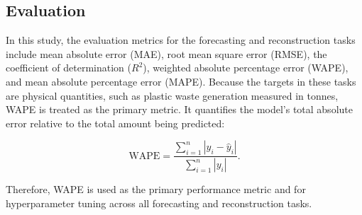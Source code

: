 \subsection{Evaluation}

In this study, the evaluation metrics for the forecasting and reconstruction tasks include mean absolute error (MAE), root mean square error (RMSE), the coefficient of determination (\(R^2\)), weighted absolute percentage error (WAPE), and mean absolute percentage error (MAPE). Because the targets in these tasks are physical quantities, such as plastic waste generation measured in tonnes, WAPE is treated as the primary metric. It quantifies the model's total absolute error relative to the total amount being predicted:

\begin{equation}
	\text{WAPE} = \frac{\sum_{i=1}^{n} |y_i - \hat{y}_i|}{\sum_{i=1}^{n} |y_i|}.
\end{equation}

Therefore, WAPE is used as the primary performance metric and for hyperparameter tuning across all forecasting and reconstruction tasks.
